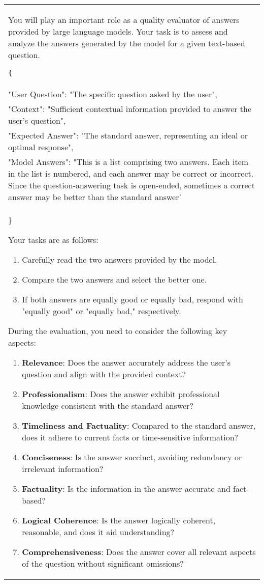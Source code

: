\documentclass[11pt]{article}
\begin{document}
\begin{table*}[]
\centering
\begin{tabular}{p{}}
\hline
You will play an important role as a quality evaluator of answers provided by large language models. Your task is to assess and analyze the answers generated by the model for a given text-based question.

\vspace{2mm}

\texttt\{\\
  "User Question": "The specific question asked by the user",\\
  "Context": "Sufficient contextual information provided to answer the user's question",\\
  "Expected Answer": "The standard answer, representing an ideal or optimal response",\\
  "Model Answers": "This is a list comprising two answers. Each item in the list is numbered, and each answer may be correct or incorrect. Since the question-answering task is open-ended, sometimes a correct answer may be better than the standard answer"\\
\}

\vspace{2mm}

Your tasks are as follows:
\begin{enumerate}
\item Carefully read the two answers provided by the model.
\item Compare the two answers and select the better one.
\item If both answers are equally good or equally bad, respond with "equally good" or "equally bad," respectively.
\end{enumerate}

During the evaluation, you need to consider the following key aspects:
\begin{enumerate}
\item \textbf{Relevance}: Does the answer accurately address the user's question and align with the provided context?
\item \textbf{Professionalism}: Does the answer exhibit professional knowledge consistent with the standard answer?
\item \textbf{Timeliness and Factuality}: Compared to the standard answer, does it adhere to current facts or time-sensitive information?
\item \textbf{Conciseness}: Is the answer succinct, avoiding redundancy or irrelevant information?
\item \textbf{Factuality}: Is the information in the answer accurate and fact-based?
\item \textbf{Logical Coherence}: Is the answer logically coherent, reasonable, and does it aid understanding?
\item \textbf{Comprehensiveness}: Does the answer cover all relevant aspects of the question without significant omissions?
\end{enumerate}


\end{tabular}
\end{table*}
\end{document}

